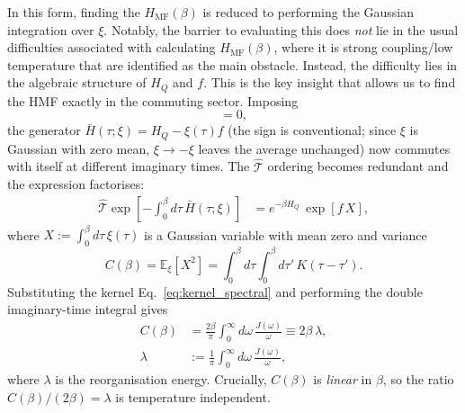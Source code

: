 In this form, finding the $H_{\mathrm{MF}}(\beta)$ is reduced to performing the Gaussian integration over $\xi$. Notably, the barrier to evaluating this does \emph{not} lie in the usual difficulties associated with calculating $H_{\mathrm{MF}}(\beta)$, where it is strong coupling/low temperature that are identified as the main obstacle. Instead, the difficulty lies in the algebraic structure of $H_Q$ and $f$. This is the key insight that allows us to find the HMF exactly in the commuting sector. Imposing
\begin{equation}
    [H_Q,f]=0,
    \label{eq:commuting_here}
\end{equation}
the generator $\bar{H}(\tau;\xi) = H_Q - \xi(\tau) f$ (the sign is conventional; since $\xi$ is Gaussian with zero mean, $\xi\to-\xi$ leaves the average unchanged) now commutes with itself at different imaginary times. The $\hat{\mathcal{T}}$ ordering becomes redundant and the expression factorises:
\begin{align}
    \hat{\mathcal{T}}\exp\!\left[-\int_0^\beta d\tau\,\bar{H}(\tau;\xi)\right]
    &=
    e^{-\beta H_Q}\, \exp\!\left[f\,X\right],
    \label{eq:tilde_rho_commuting_factorised}
\end{align}
where $X:=\int_0^\beta d\tau\,\xi(\tau)$ is a Gaussian variable with mean zero and variance
\begin{equation}
    C(\beta) = \mathbb E_\xi[X^2] = \int_0^\beta d\tau\int_0^\beta d\tau'\,K(\tau-\tau').
    \label{eq:Cbeta_def}
\end{equation}
Substituting the kernel Eq.~\eqref{eq:kernel_spectral} and performing the double
imaginary-time integral gives
\begin{align}
    C(\beta)
    &=\frac{2\beta}{\pi}\int_0^\infty d\omega\,\frac{J(\omega)}{\omega}
    \equiv 2\beta\,\lambda,
    \nonumber\\
    \lambda&:=\frac{1}{\pi}\int_0^\infty d\omega\,\frac{J(\omega)}{\omega},
    \label{eq:Cbeta_explicit}
\end{align}
where $\lambda$ is the reorganisation energy.
Crucially, $C(\beta)$ is \emph{linear} in $\beta$, so the ratio
$C(\beta)/(2\beta)=\lambda$ is temperature independent.

